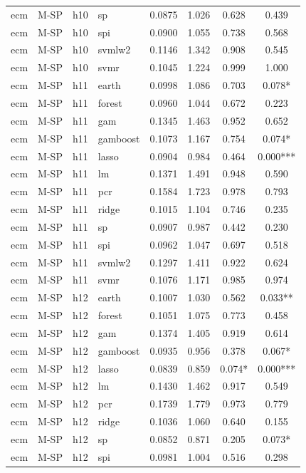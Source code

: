 \begin{ThreePartTable}
\begin{longtable}[t]{llclcccc}
ecm & M-SP & h10 & sp & 0.0875 & 1.026 & 0.628 & 0.439\\
ecm & M-SP & h10 & spi & 0.0900 & 1.055 & 0.738 & 0.568\\
ecm & M-SP & h10 & svmlw2 & 0.1146 & 1.342 & 0.908 & 0.545\\
ecm & M-SP & h10 & svmr & 0.1045 & 1.224 & 0.999 & 1.000\\
\addlinespace
ecm & M-SP & h11 & earth & 0.0998 & 1.086 & 0.703 & 0.078*\\
ecm & M-SP & h11 & forest & 0.0960 & 1.044 & 0.672 & 0.223\\
ecm & M-SP & h11 & gam & 0.1345 & 1.463 & 0.952 & 0.652\\
ecm & M-SP & h11 & gamboost & 0.1073 & 1.167 & 0.754 & 0.074*\\
ecm & M-SP & h11 & lasso & 0.0904 & 0.984 & 0.464 & 0.000***\\
ecm & M-SP & h11 & lm & 0.1371 & 1.491 & 0.948 & 0.590\\
ecm & M-SP & h11 & pcr & 0.1584 & 1.723 & 0.978 & 0.793\\
ecm & M-SP & h11 & ridge & 0.1015 & 1.104 & 0.746 & 0.235\\
ecm & M-SP & h11 & sp & 0.0907 & 0.987 & 0.442 & 0.230\\
ecm & M-SP & h11 & spi & 0.0962 & 1.047 & 0.697 & 0.518\\
ecm & M-SP & h11 & svmlw2 & 0.1297 & 1.411 & 0.922 & 0.624\\
ecm & M-SP & h11 & svmr & 0.1076 & 1.171 & 0.985 & 0.974\\
\addlinespace
ecm & M-SP & h12 & earth & 0.1007 & 1.030 & 0.562 & 0.033**\\
ecm & M-SP & h12 & forest & 0.1051 & 1.075 & 0.773 & 0.458\\
ecm & M-SP & h12 & gam & 0.1374 & 1.405 & 0.919 & 0.614\\
ecm & M-SP & h12 & gamboost & 0.0935 & 0.956 & 0.378 & 0.067*\\
ecm & M-SP & h12 & lasso & 0.0839 & 0.859 & 0.074* & 0.000***\\
ecm & M-SP & h12 & lm & 0.1430 & 1.462 & 0.917 & 0.549\\
ecm & M-SP & h12 & pcr & 0.1739 & 1.779 & 0.973 & 0.779\\
ecm & M-SP & h12 & ridge & 0.1036 & 1.060 & 0.640 & 0.155\\
ecm & M-SP & h12 & sp & 0.0852 & 0.871 & 0.205 & 0.073*\\
ecm & M-SP & h12 & spi & 0.0981 & 1.004 & 0.516 & 0.298\\

\end{longtable}
\end{ThreePartTable}
